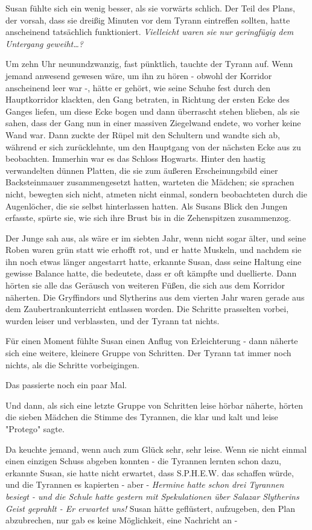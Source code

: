 {Susan fühlte sich ein wenig besser, als sie vorwärts schlich. Der Teil des Plans, der vorsah, dass sie dreißig Minuten vor dem Tyrann eintreffen sollten, hatte anscheinend tatsächlich funktioniert. \emph{Vielleicht waren sie nur geringfügig dem Untergang geweiht…?}

Um zehn Uhr neunundzwanzig, fast pünktlich, tauchte der Tyrann auf. Wenn jemand anwesend gewesen wäre, um ihn zu hören - obwohl der Korridor anscheinend leer war -, hätte er gehört, wie seine Schuhe fest durch den Hauptkorridor klackten, den Gang betraten, in Richtung der ersten Ecke des Ganges liefen, um diese Ecke bogen und dann überrascht stehen blieben, als sie sahen, dass der Gang nun in einer massiven Ziegelwand endete, wo vorher keine Wand war. Dann zuckte der Rüpel mit den Schultern und wandte sich ab, während er sich zurücklehnte, um den Hauptgang von der nächsten Ecke aus zu beobachten. Immerhin war es das Schloss Hogwarts. Hinter den hastig verwandelten dünnen Platten, die sie zum äußeren Erscheinungsbild einer Backsteinmauer zusammengesetzt hatten, warteten die Mädchen; sie sprachen nicht, bewegten sich nicht, atmeten nicht einmal, sondern beobachteten durch die Augenlöcher, die sie selbst hinterlassen hatten. Als Susans Blick den Jungen erfasste, spürte sie, wie sich ihre Brust bis in die Zehenspitzen zusammenzog.

Der Junge sah aus, als wäre er im siebten Jahr, wenn nicht sogar älter, und seine Roben waren grün statt wie erhofft rot, und er hatte Muskeln, und nachdem sie ihn noch etwas länger angestarrt hatte, erkannte Susan, dass seine Haltung eine gewisse Balance hatte, die bedeutete, dass er oft kämpfte und duellierte. Dann hörten sie alle das Geräusch von weiteren Füßen, die sich aus dem Korridor näherten. Die Gryffindors und Slytherins aus dem vierten Jahr waren gerade aus dem Zaubertrankunterricht entlassen worden. Die Schritte prasselten vorbei, wurden leiser und verblassten, und der Tyrann tat nichts.

Für einen Moment fühlte Susan einen Anflug von Erleichterung - dann näherte sich eine weitere, kleinere Gruppe von Schritten. Der Tyrann tat immer noch nichts, als die Schritte vorbeigingen.

Das passierte noch ein paar Mal.

Und dann, als sich eine letzte Gruppe von Schritten leise hörbar näherte, hörten die sieben Mädchen die Stimme des Tyrannen, die klar und kalt und leise "Protego" sagte.

Da keuchte jemand, wenn auch zum Glück sehr, sehr leise. Wenn sie nicht einmal einen einzigen Schuss abgeben konnten - die Tyrannen lernten schon dazu, erkannte Susan, sie hatte nicht erwartet, dass S.P.H.E.W. das schaffen würde, und die Tyrannen es kapierten - aber - \emph{Hermine hatte schon drei Tyrannen besiegt - und die Schule hatte gestern mit Spekulationen über Salazar Slytherins Geist geprahlt - Er erwartet uns!} Susan hätte geflüstert, aufzugeben, den Plan abzubrechen, nur gab es keine Möglichkeit, eine Nachricht an -

}
